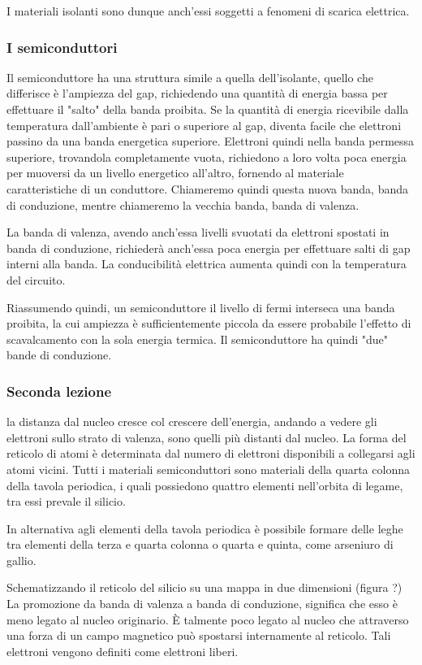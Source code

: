\documentclass[../template]{subfiles}
\begin{document}
I materiali isolanti sono dunque anch'essi soggetti a fenomeni di scarica elettrica.

\subsubsection{I semiconduttori}
Il semiconduttore ha una struttura simile a quella dell'isolante, quello che differisce è l'ampiezza del gap, richiedendo una quantità di energia bassa per effettuare il "salto" della banda proibita.
Se la quantità di energia ricevibile dalla temperatura dall'ambiente è pari o superiore al gap, diventa facile che elettroni passino da una banda energetica superiore.
Elettroni quindi nella banda permessa superiore, trovandola completamente vuota, richiedono a loro volta poca energia per muoversi da un livello energetico all'altro, fornendo al materiale caratteristiche di un conduttore.
Chiameremo quindi questa nuova banda, banda di conduzione, mentre chiameremo la vecchia banda, banda di valenza.

La banda di valenza, avendo anch'essa livelli svuotati da elettroni spostati in banda di conduzione, richiederà anch'essa poca energia per effettuare salti di gap interni alla banda.
La conducibilità elettrica aumenta quindi con la temperatura del circuito.

Riassumendo quindi, un semiconduttore il livello di fermi interseca una banda proibita, la cui ampiezza è sufficientemente piccola da essere probabile l'effetto di scavalcamento con la sola energia termica.
Il semiconduttore ha quindi "due" bande di conduzione.


\subsubsection{Seconda lezione}
la distanza dal nucleo cresce col crescere dell'energia, andando a vedere gli elettroni sullo strato di valenza, sono quelli più distanti dal nucleo.
La forma del reticolo di atomi è determinata dal numero di elettroni disponibili a collegarsi agli atomi vicini.
Tutti i materiali semiconduttori sono materiali della quarta colonna della tavola periodica, i quali possiedono quattro elementi nell'orbita di legame, tra essi prevale il silicio.

In alternativa agli elementi della tavola periodica è possibile formare delle leghe tra elementi della terza e quarta colonna o quarta e quinta, come arseniuro di gallio.

Schematizzando il reticolo del silicio su una mappa in due dimensioni (figura ?)
La promozione da banda di valenza a banda di conduzione, significa che esso è meno legato al nucleo originario. È talmente poco legato al nucleo che attraverso una forza di un campo magnetico può spostarsi internamente al reticolo.
Tali elettroni vengono definiti come elettroni liberi.
\end{document}

